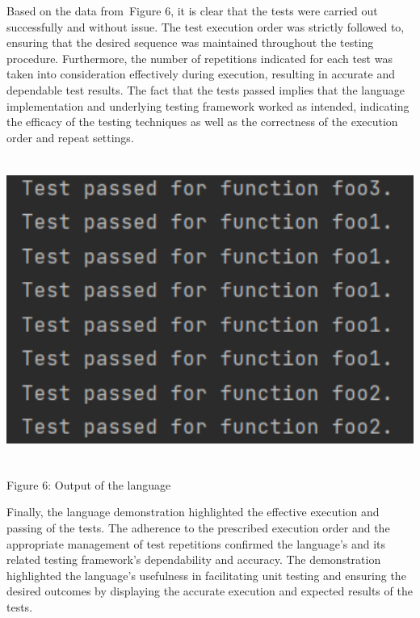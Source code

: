 Based on the data from Figure 6, it is clear that the tests were carried out successfully and without issue. The test execution order was strictly followed to, ensuring that the desired sequence was maintained throughout the testing procedure. Furthermore, the number of repetitions indicated for each test was taken into consideration effectively during execution, resulting in accurate and dependable test results. The fact that the tests passed implies that the language implementation and underlying testing framework worked as intended, indicating the efficacy of the testing techniques as well as the correctness of the execution order and repeat settings.

{ \centering \includegraphics[width=\textwidth, height=10cm]{images/demo1.png} }
\begin{center} Figure 6: Output of the language \end{center}

Finally, the language demonstration highlighted the effective execution and passing of the tests. The adherence to the prescribed execution order and the appropriate management of test repetitions confirmed the language's and its related testing framework's dependability and accuracy. The demonstration highlighted the language's usefulness in facilitating unit testing and ensuring the desired outcomes by displaying the accurate execution and expected results of the tests.
